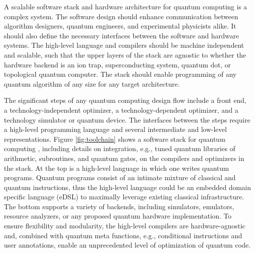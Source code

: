 \documentclass[journal]{IEEEtran}
\begin{document}
A scalable software stack and hardware architecture for quantum computing is a complex system.
The software design should enhance communication between algorithm designers, quantum engineers, and experimental physicists alike.
It should also define the necessary interfaces between the software and hardware systems.
The high-level language and compilers should be machine independent and scalable, such that the upper layers of the stack are agnostic to whether the hardware backend is an ion trap, superconducting system, quantum dot, or topological quantum computer.
The stack should enable programming of any quantum algorithm of any size for any target architecture.

The significant steps of any quantum computing design flow \cite{svore2006layered} include a front end, a technology-independent optimizer, a technology-dependent optimizer, and a technology simulator or quantum device.  The interfaces between the steps require a high-level programming language and several intermediate and low-level representations.
Figure \ref{fig:toolchain} shows a software stack for quantum computing \cite{}, including details on integration, e.g., tuned quantum libraries of arithmetic, subroutines, and quantum gates, on the compilers and optimizers in the stack.
At the top is a high-level language in which one writes quantum programs.
Quantum programs consist of an intimate mixture of classical and quantum instructions, thus the high-level language could be an embedded domain specific language (eDSL) to maximally leverage existing classical infrastructure.
The bottom supports a variety of backends, including simulators, emulators, resource analyzers, or any proposed quantum hardware implementation.
To ensure flexibility and modularity, the high-level compilers are hardware-agnostic and, combined with quantum meta functions, e.g., conditional instructions and user annotations, enable an unprecedented level of optimization of quantum code.

\end{document}
